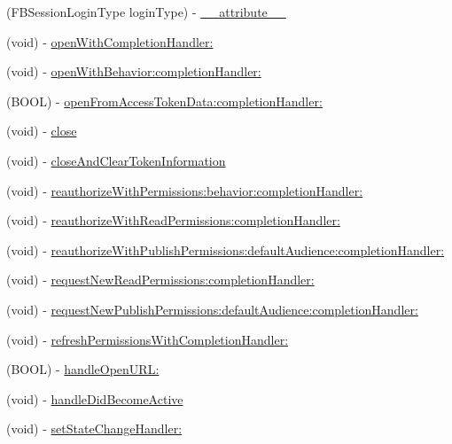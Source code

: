 \begin{DoxyCompactItemize}
\item 
(F\+B\+Session\+Login\+Type login\+Type) -\/ \hyperlink{interfaceFBSession_acd3c247502e2514d93ccf123ad4824f8}{\+\_\+\+\_\+attribute\+\_\+\+\_\+}
\item 
(void) -\/ \hyperlink{interfaceFBSession_a874152230789c87cd181d1f976e3715f}{open\+With\+Completion\+Handler\+:}
\item 
(void) -\/ \hyperlink{interfaceFBSession_add7058f99fde92c093a92acf192dcd0a}{open\+With\+Behavior\+:completion\+Handler\+:}
\item 
(B\+O\+OL) -\/ \hyperlink{interfaceFBSession_a669e34ba5599646255507299f7a60dac}{open\+From\+Access\+Token\+Data\+:completion\+Handler\+:}
\item 
(void) -\/ \hyperlink{interfaceFBSession_a91eccb960e90fc8cc6d24df1b2e94ce3}{close}
\item 
(void) -\/ \hyperlink{interfaceFBSession_ac4ad0564da77b3cecc0c67f762f5f1c7}{close\+And\+Clear\+Token\+Information}
\item 
(void) -\/ \hyperlink{interfaceFBSession_ac78d18a8fc82c995e326f2866ca9298f}{reauthorize\+With\+Permissions\+:behavior\+:completion\+Handler\+:}
\item 
(void) -\/ \hyperlink{interfaceFBSession_a5c15996bb59afc28460f92645cf6e7f0}{reauthorize\+With\+Read\+Permissions\+:completion\+Handler\+:}
\item 
(void) -\/ \hyperlink{interfaceFBSession_af0b2652e875c4996166b1c7ce3d12b73}{reauthorize\+With\+Publish\+Permissions\+:default\+Audience\+:completion\+Handler\+:}
\item 
(void) -\/ \hyperlink{interfaceFBSession_a14cf87331489399e4317bda2c718d3a3}{request\+New\+Read\+Permissions\+:completion\+Handler\+:}
\item 
(void) -\/ \hyperlink{interfaceFBSession_a86dd849f0bd1f667e6107a13deb4607d}{request\+New\+Publish\+Permissions\+:default\+Audience\+:completion\+Handler\+:}
\item 
(void) -\/ \hyperlink{interfaceFBSession_a569f5daa686e4593bd0d5e68016a15a0}{refresh\+Permissions\+With\+Completion\+Handler\+:}
\item 
(B\+O\+OL) -\/ \hyperlink{interfaceFBSession_a99548fc3fd7dc7f5b8dc24019be88000}{handle\+Open\+U\+R\+L\+:}
\item 
(void) -\/ \hyperlink{interfaceFBSession_a647536f4770fc746b6865ad610779767}{handle\+Did\+Become\+Active}
\item 
(void) -\/ \hyperlink{interfaceFBSession_a56e9467165f832f3151dadd14190868b}{set\+State\+Change\+Handler\+:}

\end{DoxyCompactItemize}
